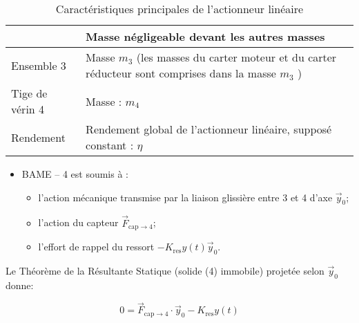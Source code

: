 \begin{table}[!h]
\begin{center}
\begin{tabular}{lp{8cm}}
 & Masse négligeable devant les autres masses \\
\hline
Ensemble 3 & Masse $m_{3}$ (les masses du carter moteur et du carter réducteur sont comprises dans la masse $m_{3}$ ) \\
\hline
Tige de vérin 4 & Masse : $m_{4}$ \\
\hline
Rendement & Rendement global de l'actionneur linéaire, supposé constant : $\eta$ \\
\hline
\end{tabular}
\caption{\label{ccs_mp_2023_tab_03} Caractéristiques principales de l'actionneur linéaire}
\end{center}
\end{table}
\fi


\ifprof
\begin{corrige}
\begin{itemize}
On isole le solide 4.
\item BAME -- 4 est soumis à :
\begin{itemize}
\item l'action mécanique transmise par la liaison glissière entre 3 et 4 d'axe $\overrightarrow{y}_0$;
\item l'action du capteur $\overrightarrow{F}_{\text{cap} \to 4}$;
\item l'effort de rappel du ressort $-K_{\text{res}} y(t) \overrightarrow{y}_0$.
\end{itemize}
\end{itemize}

Le Théorème de la Résultante Statique (solide (4) immobile) projetée selon $\overrightarrow{y}_0$ donne:

$$ \boxed{0 = \overrightarrow{F}_{\text{cap} \to 4} \cdot \overrightarrow{y}_0 - K_{\text{res}} y(t)} $$

\end{corrige}
\else
\fi

